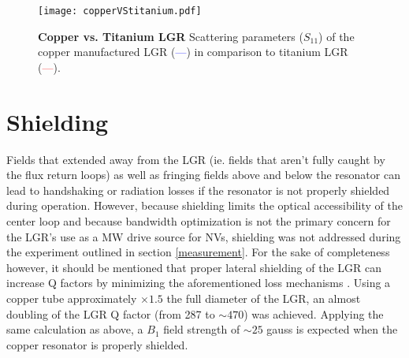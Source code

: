 \begin{figure}[t!]
\centering
\texttt{[image: copperVStitanium.pdf]}  
\caption{\textbf{Copper vs. Titanium LGR} Scattering parameters ($S_{11}$) of the copper manufactured LGR (\textcolor{blue}{---}) in comparison to titanium LGR (\textcolor{red}{---}).}
\label{LGR_Coppervstit}
\end{figure} 

\section{Shielding}  

Fields that extended away from the LGR (ie. fields that aren't fully caught by the flux return loops) as well as fringing fields above and below the resonator can lead to handshaking or radiation losses if the resonator is not properly shielded during operation. However, because shielding limits the optical accessibility of the center loop and because bandwidth optimization is not the primary concern for the LGR's use as a MW drive source for NVs, shielding was not addressed during the experiment outlined in section \ref{measurement}. For the sake of completeness however, it should be mentioned that proper lateral shielding of the LGR can increase Q factors by minimizing the aforementioned loss mechanisms \cite{petryakov2001bridged, rinard2005loopgap}. Using a copper tube approximately $\times 1.5$ the full diameter of the LGR, an almost doubling of the LGR Q factor (from 287 to $\sim 470$) was achieved. Applying the same calculation as above, a $B_1$ field strength of $\sim 25$ gauss is expected when the copper resonator is properly shielded.   

\clearpage
\newpage
